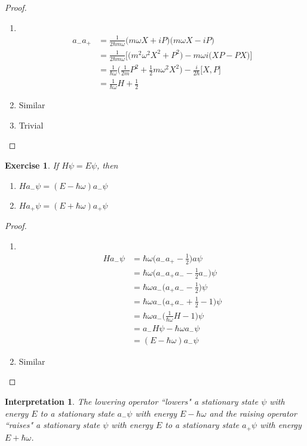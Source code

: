 \documentclass[12pt]{amsart}
\newtheorem{intp}[thm]{Interpretation}
\newtheorem{ex}[thm]{Exercise}
\newcommand{\om}{\omega}
\begin{document}
\begin{proof}
\begin{enumerate}
\item \
\begin{align*}
a_- a_+
&= \frac{1}{2\hbar m \om}\big(m \om X + iP \big) \big( m\om X - iP )\\
&= \frac{1}{2 \hbar m \om} \bigg[ \big(m^2 \om^2 X^2 + P^2 \big) - m\om i\big(XP - PX \big) \bigg]\\
&= \frac{1}{\hbar \om}\big(\frac{1}{2m}P^2 + \frac{1}{2}m \om^2 X^2 \big) - \frac{i}{2 \hbar}\big[X,P \big]\\
&= \frac{1}{\hbar \om}H + \frac{1}{2}
\end{align*}
\item Similar
\item Trivial
\end{enumerate}
\end{proof}

\begin{ex}
If $H\psi = E\psi$, then 
\begin{enumerate}
\item $Ha_-\psi = (E-\hbar \om) a_- \psi$
\item $Ha_+\psi = (E+\hbar \om) a_+ \psi$
\end{enumerate}
\end{ex}

\begin{proof}\
\begin{enumerate}
\item \
\begin{align*}
Ha_-\psi 
&= \hbar \om \bigg(a_-a_+-\frac{1}{2}\bigg)a \psi\\
&= \hbar \om \bigg(a_-a_+a_- -\frac{1}{2}a_-\bigg) \psi\\
&= \hbar \om a_-\bigg(a_+a_- -\frac{1}{2}\bigg) \psi\\
&= \hbar \om a_-\bigg(a_+a_- +\frac{1}{2} -1\bigg) \psi\\
&= \hbar \om a_-\bigg(\frac{1}{\hbar \om}H -1\bigg) \psi\\
&= a_- H\psi -\hbar \om a_- \psi \\
&= (E - \hbar \om)a_-\psi 
\end{align*}
\item Similar
\end{enumerate}
\end{proof}

\begin{intp}
The lowering operator ``lowers"  a stationary state $\psi$ with energy $E$ to a stationary state $a_-\psi$ with energy $E-\hbar \om$ and the raising operator ``raises"  a stationary state $\psi$ with energy $E$ to a stationary state $a_+\psi$ with energy $E+\hbar \om$.
\end{intp}
\end{document}
